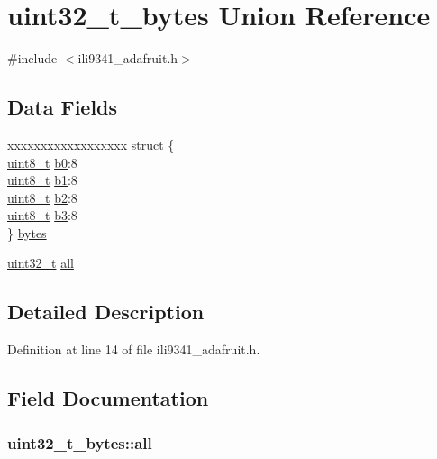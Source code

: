 \hypertarget{unionuint32__t__bytes}{\section{uint32\-\_\-t\-\_\-bytes Union Reference}
\label{unionuint32__t__bytes}
}


{\ttfamily \#include $<$ili9341\-\_\-adafruit.\-h$>$}

\subsection*{Data Fields}
\begin{DoxyCompactItemize}
\item 
\begin{tabbing}
xx\=xx\=xx\=xx\=xx\=xx\=xx\=xx\=xx\=\kill
struct \{\\
\>\hyperlink{send_8c_aba7bc1797add20fe3efdf37ced1182c5}{uint8\_t} \hyperlink{unionuint32__t__bytes_a92b86537decb69327191d870f41c60f7}{b0}:8\\
\>\hyperlink{send_8c_aba7bc1797add20fe3efdf37ced1182c5}{uint8\_t} \hyperlink{unionuint32__t__bytes_a91fb31482a2ce44b454fca964dcd556b}{b1}:8\\
\>\hyperlink{send_8c_aba7bc1797add20fe3efdf37ced1182c5}{uint8\_t} \hyperlink{unionuint32__t__bytes_a462312b99de0c6d1c497064902196e1d}{b2}:8\\
\>\hyperlink{send_8c_aba7bc1797add20fe3efdf37ced1182c5}{uint8\_t} \hyperlink{unionuint32__t__bytes_abd7739cae59fab7cf712d53f337b378a}{b3}:8\\
\} \hyperlink{unionuint32__t__bytes_a50aeebe398ee3b740421f1cc8d8583b8}{bytes}\\

\end{tabbing}\item 
\hyperlink{send_8c_a435d1572bf3f880d55459d9805097f62}{uint32\-\_\-t} \hyperlink{unionuint32__t__bytes_a83b0c87830b60d185365dbadf8efd4a0}{all}
\end{DoxyCompactItemize}


\subsection{Detailed Description}


Definition at line 14 of file ili9341\-\_\-adafruit.\-h.



\subsection{Field Documentation}
\hypertarget{unionuint32__t__bytes_a83b0c87830b60d185365dbadf8efd4a0}{
\subsubsection[{all}]{ uint32\-\_\-t\-\_\-bytes\-::all}}\label{unionuint32__t__bytes_a83b0c87830b60d185365dbadf8efd4a0}


